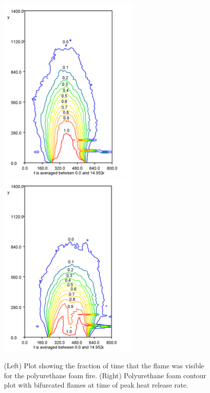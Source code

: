 \documentclass[twoside]{uocthesis}
\begin{document}
{{\begin{figure}
  \includegraphics[width=2.7in]{../Figures/Fig22}
  \includegraphics[width=2.7in]{../Figures/Fig23} \\
  \caption[Visibility fractions for the polyurethane foam fire]{(Left) Plot showing the fraction of time that the flame was visible for the polyurethane foam fire. (Right) Polyurethane foam contour plot with bifurcated flames at time of peak heat release rate.}
  \label{Foam_Contours}
\end{figure}

}}
\end{document}
